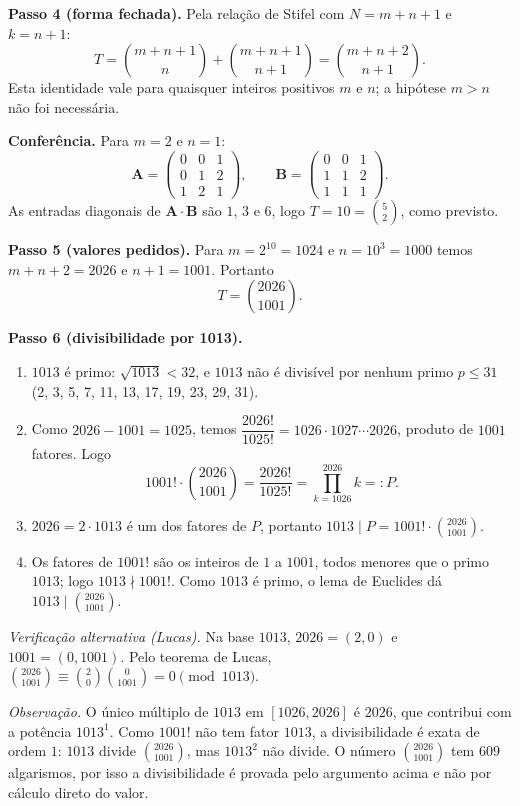 \documentclass{article}%
\begin{document}
\textbf{Passo 4 (forma fechada).} Pela relação de Stifel com $N=m+n+1$ e $k=n+1$:
\[
T=\binom{m+n+1}{n}+\binom{m+n+1}{n+1}=\binom{m+n+2}{n+1}.
\]
Esta identidade vale para quaisquer inteiros positivos $m$ e $n$; a hipótese $m>n$ não foi necessária.

\textbf{Conferência.} Para $m=2$ e $n=1$:
\[
\mathbf{A}=\begin{pmatrix}0&0&1\\0&1&2\\1&2&1\end{pmatrix},\qquad \mathbf{B}=\begin{pmatrix}0&0&1\\1&1&2\\1&1&1\end{pmatrix}.
\]
As entradas diagonais de $\mathbf{A}\cdot\mathbf{B}$ são $1$, $3$ e $6$, logo $T=10=\binom{5}{2}$, como previsto.

\textbf{Passo 5 (valores pedidos).} Para $m=2^{10}=1024$ e $n=10^3=1000$ temos $m+n+2=2026$ e $n+1=1001$. Portanto
\[
T=\binom{2026}{1001}.
\]

\textbf{Passo 6 (divisibilidade por 1013).}
\begin{enumerate}
\item $1013$ é primo: $\sqrt{1013}<32$, e $1013$ não é divisível por nenhum primo $p\le 31$ (2, 3, 5, 7, 11, 13, 17, 19, 23, 29, 31).
\item Como $2026-1001=1025$, temos $\dfrac{2026!}{1025!}=1026\cdot 1027\cdots 2026$, produto de $1001$ fatores. Logo
\[
1001!\cdot\binom{2026}{1001}=\frac{2026!}{1025!}=\prod_{k=1026}^{2026}k=:P.
\]
\item $2026=2\cdot 1013$ é um dos fatores de $P$, portanto $1013\mid P=1001!\cdot\binom{2026}{1001}$.
\item Os fatores de $1001!$ são os inteiros de $1$ a $1001$, todos menores que o primo $1013$; logo $1013\nmid 1001!$. Como $1013$ é primo, o lema de Euclides dá $1013\mid\binom{2026}{1001}$.
\end{enumerate}

\textit{Verificação alternativa (Lucas).} Na base $1013$, $2026=(2,0)$ e $1001=(0,1001)$. Pelo teorema de Lucas, $\binom{2026}{1001}\equiv\binom{2}{0}\binom{0}{1001}=0 \pmod{1013}$.

\textit{Observação.} O único múltiplo de $1013$ em $[1026,2026]$ é $2026$, que contribui com a potência $1013^1$. Como $1001!$ não tem fator $1013$, a divisibilidade é exata de ordem $1$: $1013$ divide $\binom{2026}{1001}$, mas $1013^2$ não divide. O número $\binom{2026}{1001}$ tem $609$ algarismos, por isso a divisibilidade é provada pelo argumento acima e não por cálculo direto do valor.
\end{document}
